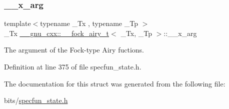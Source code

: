 \subsubsection{\texorpdfstring{\+\_\+\+\_\+x\+\_\+arg}{\_\_x\_arg}}
{\footnotesize\ttfamily template$<$typename \+\_\+\+Tx , typename \+\_\+\+Tp $>$ \\
\+\_\+\+Tx \hyperlink{struct____gnu__cxx_1_1____fock__airy__t}{\+\_\+\+\_\+gnu\+\_\+cxx\+::\+\_\+\+\_\+fock\+\_\+airy\+\_\+t}$<$ \+\_\+\+Tx, \+\_\+\+Tp $>$\+::\+\_\+\+\_\+x\+\_\+arg}



The argument of the Fock-\/type Airy fuctions. 



Definition at line 375 of file specfun\+\_\+state.\+h.



The documentation for this struct was generated from the following file\+:\begin{DoxyCompactItemize}
\item 
bits/\hyperlink{specfun__state_8h}{specfun\+\_\+state.\+h}\end{DoxyCompactItemize}
